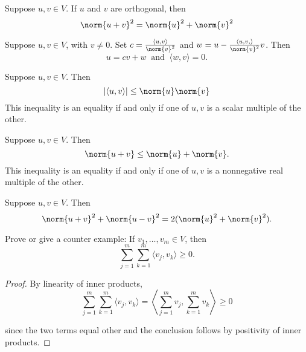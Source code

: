 \documentclass{extarticle}
\begin{document}
\begin{thm}
    Suppose \(u, v \in V\). If \(u\) and \(v\) are orthogonal, then
    \[\norm{u + v}^2 = \norm{u}^2 + \norm{v}^2\]
\end{thm}

\begin{lemma}
    Suppose \( u, v \in V\), with \(v \neq 0\). Set \(c = \frac{\langle u,v \rangle}{\norm{v}^2}\) and
    \(w = u - \frac{\langle u, v, \rangle}{\norm{v}^2}v\). Then
    \[u = cv+w \ \text{ and } \ \langle w,v \rangle = 0.\]
\end{lemma}

\begin{thm}
    Suppose \(u, v \in V\). Then
    \[|\langle u,v \rangle| \leq \norm{ u } \norm{ v }\]
    This inequality is an equality if and only if one of \(u, v\) is a scalar multiple of the other.
\end{thm}

\begin{thm}
    Suppose \(u, v \in V\). Then
    \[\norm{ u+v }\leq \norm{ u } + \norm{ v }.\]
    This inequality is an equality if and only if one of \(u, v\) is a nonnegative real multiple of the other.
\end{thm}

\begin{thm}
    Suppose \(u, v \in V\). Then
    \[\norm{ u +v }^2 + \norm{ u-v }^2 = 2(\norm{u}^2 + \norm{v}^2).\]
\end{thm}


\newpage
{}

\begin{problem}{1}
    Prove or give a counter example: If \(v_1, \ldots, v_m \in V\), then
    \[\sum_{j=1}^{m}\sum_{k=1}^{m} \langle v_j,v_k \rangle \geq 0.\]
\end{problem}

\begin{proof}
By linearity of inner products,
\[\sum_{j=1}^{m}\sum_{k=1}^{m} \langle v_j,v_k \rangle
= \left\langle \sum_{j=1}^{m} v_j, \sum_{k=1}^{m} v_k \right\rangle \geq 0\]

since the two terms equal other and the conclusion follows by positivity of inner products.
\end{proof}
\end{document}
